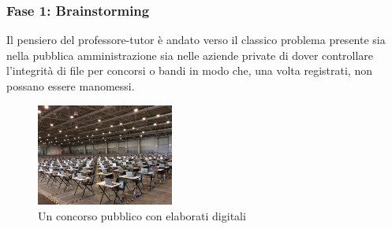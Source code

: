 \documentclass{beamer}
\begin{document}
\begin{frame}
	\frametitle{Fase 1: Brainstorming}
	Il pensiero del professore-tutor è andato verso il classico problema presente sia nella pubblica amministrazione sia nelle aziende private di dover controllare l’integrità di file per concorsi o bandi in modo che, una volta registrati, non possano essere manomessi.
	\medskip
	\begin{figure}
		\includegraphics[width=0.40\textwidth]{figures/concorso-fiera-di-roma.jpg}
		\caption{Un concorso pubblico con elaborati digitali}
	\end{figure}
\end{frame}
\end{document}

